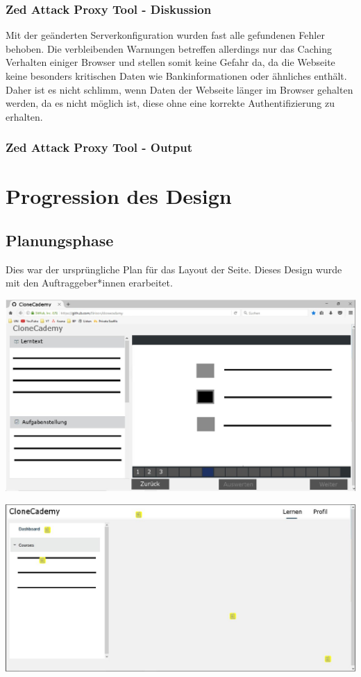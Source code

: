 \documentclass[accentcolor=tud0b,12pt,paper=a4]{tudreport}
\begin{document}
	
	\subsection*{Zed Attack Proxy Tool - Diskussion}
	Mit der geänderten Serverkonfiguration wurden fast alle gefundenen Fehler behoben. Die verbleibenden Warnungen betreffen allerdings nur das Caching Verhalten einiger Browser und stellen somit keine Gefahr da, da die Webseite keine besonders kritischen Daten wie Bankinformationen oder ähnliches enthält. Daher ist es nicht schlimm, wenn Daten der Webseite länger im Browser gehalten werden, da es nicht möglich ist, diese ohne eine korrekte Authentifizierung zu erhalten.

	\subsection*{Zed Attack Proxy Tool - Output}
	


\chapter{Progression des Design}

	\section*{Planungsphase}
	Dies war der ursprüngliche Plan für das Layout der Seite. Dieses Design wurde mit den Auftraggeber*innen erarbeitet.

	\includegraphics[height=0.3\textheight]{appendix/bilder/design_example_1-0.jpg}

	\includegraphics[height=0.3\textheight]{appendix/bilder/design_example_2-0.jpg}
\end{document}
